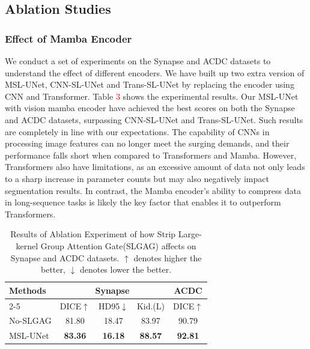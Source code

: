\documentclass[10pt, a4paper, twocolumn]{article}
\begin{document}
\subsection{Ablation Studies}


\subsubsection{Effect of Mamba Encoder}

We conduct a set of experiments on the Synapse and ACDC datasets to understand the effect of different encoders. We have built up two extra version of MSL-UNet, CNN-SL-UNet and Trans-SL-UNet by replacing the encoder using CNN and Transformer. Table \textcolor{red}{3} shows the experimental results. Our MSL-UNet with vision mamba encoder have achieved the best scores on both the Synapse and ACDC datasets, surpassing CNN-SL-UNet and Trans-SL-UNet. Such results are completely in line with our expectations. The capability of CNNs in processing image features can no longer meet the surging demands, and their performance falls short when compared to Transformers and Mamba. However, Transformers also have limitations, as an excessive amount of data not only leads to a sharp increase in parameter counts but may also negatively impact segmentation results. In contrast, the Mamba encoder's ability to compress data in long-sequence\cite{yu2024mambaout} tasks is likely the key factor that enables it to outperform Transformers.






\begin{table}
\small
\centering
\begin{tabular}{l|ccc|c}\hline
\multirow{2}{*}{Methods} & \multicolumn{3}{c|}{Synapse} & ACDC \\\cline{2-5}
& DICE$\uparrow$ & HD95$\downarrow$ &Kid.(L) & DICE$\uparrow$ \\\hline
No-SLGAG & 81.80 & 18.47 &83.97  & 90.79\\\hline
MSL-UNet & \textbf{83.36} & \textbf{16.18} &\textbf{88.57}  & \textbf{92.81} \\\hline
\end{tabular}
\caption{Results of Ablation Experiment of how Strip Large-kernel Group Attention Gate(SLGAG) affects on Synapse and ACDC datasets. $\uparrow$ denotes higher the better, $\downarrow$ denotes lower the better.}
\end{table}
\end{document}
